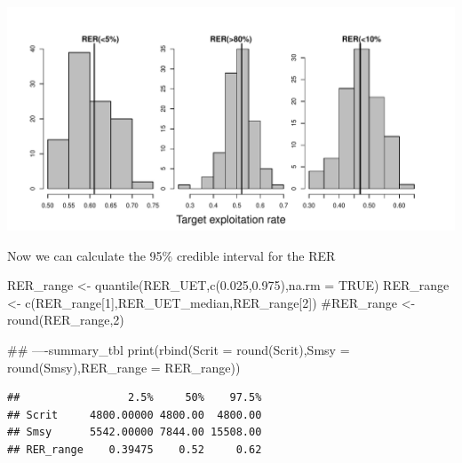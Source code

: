 \documentclass[
  11pt,
]{article}
\newenvironment{Shaded}{}{}
\newcommand{\CommentTok}[1]{\textcolor[rgb]{0.00,0.50,0.00}{#1}}
\newcommand{\DataTypeTok}[1]{#1}
\newcommand{\DecValTok}[1]{#1}
\newcommand{\FloatTok}[1]{#1}
\newcommand{\KeywordTok}[1]{\textcolor[rgb]{0.00,0.00,1.00}{#1}}
\newcommand{\NormalTok}[1]{#1}
\newcommand{\OtherTok}[1]{\textcolor[rgb]{1.00,0.25,0.00}{#1}}
\newcommand{\StringTok}[1]{\textcolor[rgb]{0.00,0.50,0.50}{#1}}
\begin{document}
\includegraphics{App_2_Summarize_results_Summer_Fall_Chinook_files/figure-latex/plot_RER_posterior_dist-1.pdf}

Now we can calculate the 95\% credible interval for the RER

\begin{Shaded}
\begin{Highlighting}[]
\NormalTok{RER_range <-}\StringTok{ }\KeywordTok{quantile}\NormalTok{(RER_UET,}\KeywordTok{c}\NormalTok{(}\FloatTok{0.025}\NormalTok{,}\FloatTok{0.975}\NormalTok{),}\DataTypeTok{na.rm =} \OtherTok{TRUE}\NormalTok{)}
\NormalTok{RER_range <-}\StringTok{ }\KeywordTok{c}\NormalTok{(RER_range[}\DecValTok{1}\NormalTok{],RER_UET_median,RER_range[}\DecValTok{2}\NormalTok{])}
\CommentTok{#RER_range <- round(RER_range,2)}

\CommentTok{## ----summary_tbl}
\KeywordTok{print}\NormalTok{(}\KeywordTok{rbind}\NormalTok{(}\DataTypeTok{Scrit =} \KeywordTok{round}\NormalTok{(Scrit),}\DataTypeTok{Smsy =} \KeywordTok{round}\NormalTok{(Smsy),}\DataTypeTok{RER_range =}\NormalTok{ RER_range))}
\end{Highlighting}
\end{Shaded}

\begin{verbatim}
##                 2.5%     50%    97.5%
## Scrit     4800.00000 4800.00  4800.00
## Smsy      5542.00000 7844.00 15508.00
## RER_range    0.39475    0.52     0.62
\end{verbatim}
\end{document}
